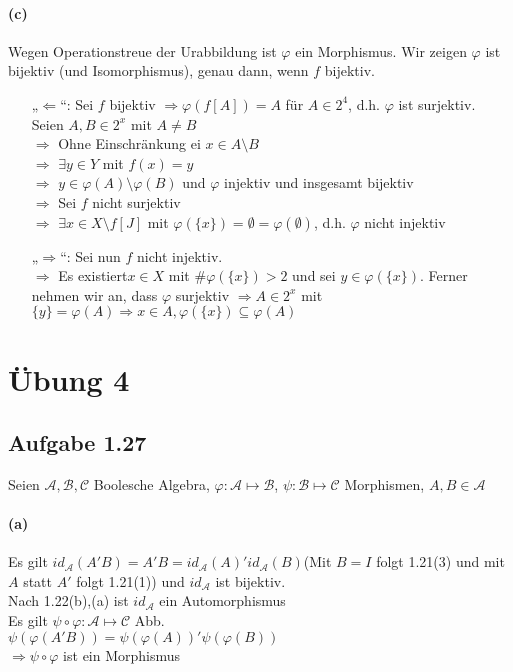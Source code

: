 \documentclass[10pt, a4paper]{article}
\begin{document}
\paragraph*{(c)}
Wegen Operationstreue der Urabbildung ist $\varphi$ ein Morphismus.
Wir zeigen $\varphi$ ist bijektiv (und Isomorphismus), genau dann, wenn $f$ bijektiv.
\begin{itemize}
	\item[„$\Leftarrow$“:] Sei $f$ bijektiv $\Rightarrow\varphi(f[A])=A$ für $A\in2^{4}$, d.h. $\varphi$ ist surjektiv.	\\
	Seien $A,B\in2^{x}$ mit $A\neq B$	\\
	$\Rightarrow$ Ohne Einschränkung ei $x\in A\setminus B$	\\
	$\Rightarrow$ $\exists y\in Y$ mit $f(x)=y$	\\
	$\Rightarrow$ $y\in\varphi(A)\setminus\varphi(B)$ und $\varphi$ injektiv und insgesamt bijektiv	\\
	$\Rightarrow$	Sei $f$ nicht surjektiv	\\
	$\Rightarrow$ $\exists x\in X\setminus f[J]$ mit $\varphi(\{x\})=\emptyset=\varphi(\emptyset)$, d.h. $\varphi$ nicht injektiv	\\
	\item[„$\Rightarrow$“:] Sei nun $f$ nicht injektiv.	\\
	$\Rightarrow$ Es existiert$x\in X$ mit $\#\varphi(\{x\})>2$ und sei $y\in\varphi(\{x\})$. Ferner nehmen wir an, dass $\varphi$ surjektiv $\Rightarrow A\in2^{x}$ mit $\{y\}=\varphi(A) \Rightarrow x\in A, \varphi(\{x\})\subseteq\varphi(A)$\lightning
\end{itemize}


\section{Übung 4}
\subsection{Aufgabe 1.27}
Seien $\mathcal{A,B,C}$ Boolesche Algebra, $\varphi : \boxed{\mathcal{A}} \mapsto \boxed{\mathcal{B}}$, $\psi  : \boxed{\mathcal{B}} \mapsto \boxed{\mathcal{C}}$ Morphismen, $A,B\in \mathcal{A}$

\paragraph*{(a)}Es gilt $id_\mathcal{A}(A'B)=A'B=id_\mathcal{A}(A)'id_\mathcal{A}(B)$\hspace{10pt}(Mit $B=I$ folgt 1.21(3) und mit $A$ statt $A'$ folgt 1.21(1)) und $id_\mathcal{A}$ ist bijektiv.	\\
\vspace{3pt}
Nach 1.22(b),(a) ist $id_\mathcal{A}$ ein Automorphismus	\\
\vspace{3pt}
Es gilt $\psi \circ \varphi : \mathcal{A}\mapsto\mathcal{C}$ Abb.\\
\vspace{3pt}
$\psi(\varphi(A'B))=\psi(\varphi(A))'\psi(\varphi(B))$	\\
\vspace{3pt}
$\Rightarrow\psi\circ\varphi$ ist ein Morphismus
\end{document}
